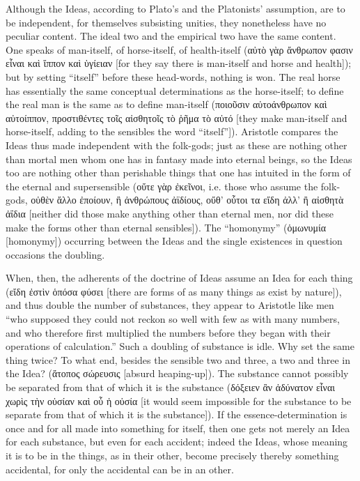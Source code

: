 \documentclass[12pt]{book}
\begin{document}
Although the Ideas, according to Plato's and the Platonists' assumption, are to be independent, for
themselves subsisting unities, they nonetheless have no peculiar content. The ideal two and the
empirical two have the same content. One speaks of man-itself, of horse-itself, of health-itself (αὐτὸ
γὰρ ἄνθρωπον φασιν εἶναι καὶ ἵππον καὶ ὑγίειαν [for they say there is man-itself and horse and health]);
but by setting ``itself'' before these head-words, nothing is won. The real horse has essentially the
same conceptual determinations as the horse-itself; to define the real man is the same as to define
man-itself (ποιοῦσιν αὐτοάνθρωπον καὶ αὐτοίππον, προστιθέντες τοῖς αἰσθητοῖς τὸ ῥῆμα τὸ αὐτό [they make
man-itself and horse-itself, adding to the sensibles the word ``itself'']). Aristotle compares the Ideas
thus made independent with the folk-gods; just as these are nothing other than mortal men whom one has
in fantasy made into eternal beings, so the Ideas too are nothing other than perishable things that one
has intuited in the form of the eternal and supersensible (οὔτε γὰρ ἐκεῖνοι, i.e. those who assume the
folk-gods,
οὐθὲν ἄλλο ἐποίουν, ἢ ἀνθρώπους ἀϊδίους, οὔθ' οὗτοι τα εἴδη ἀλλ' ἢ αἰσθητὰ ἀΐδια [neither did those make
anything other than eternal men, nor did these make the forms other than eternal sensibles]). The
``homonymy'' (ὁμωνυμία [homonymy]) occurring between the Ideas and the single existences in question
occasions the doubling.

When, then, the adherents of the doctrine of Ideas assume an Idea for each thing (εἴδη ἐστὶν ὁπόσα φύσει
[there are forms of as many things as exist by nature]), and thus double the number of substances, they
appear to Aristotle like men ``who supposed they could not reckon so well with few as with many numbers,
and who therefore first multiplied the numbers before they began with their operations of calculation.''
Such a doubling of substance is idle. Why set the same thing twice? To what end, besides the sensible two
and three, a two and three in the Idea? (ἄτοπος σώρευσις [absurd heaping-up]). The substance cannot
possibly be separated from that of which it is the substance (δόξειεν ἂν ἀδύνατον εἶναι χωρὶς τὴν οὐσίαν
καὶ οὗ ἡ οὐσία [it would seem impossible for the substance to be separate from that of which it is the
substance]). If the essence-determination is once and for all made into something for itself, then one
gets not merely an Idea for each substance, but even for each accident; indeed the Ideas, whose meaning
it is to be in the things, as in their other, become precisely thereby something accidental, for only
the accidental can be in an other.
\end{document}
